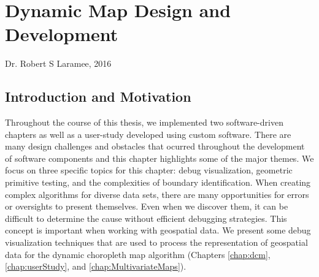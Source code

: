 \chapter{Dynamic Map Design and Development}
\label{chap:softdev}

{Dr. Robert S Laramee, 2016}

\newpage
{\footnotesize \hypersetup{linkcolor=black}
\minitoc} \newpage

\section{Introduction and Motivation}
Throughout the course of this thesis, we implemented two software-driven chapters as well as a user-study developed using custom software. There are many design challenges and obstacles that ocurred throughout the development of software components and this chapter highlights some of the major themes. We focus on three specific topics for this chapter: debug visualization, geometric primitive testing, and the complexities of boundary identification.
When creating complex algorithms for diverse data sets, there are many opportunities for errors or oversights to present themselves. Even when we discover them, it can be difficult to determine the cause without efficient debugging strategies. This concept is important when working with geospatial data.
We present some debug visualization techniques that are used to process the representation of geospatial data for the dynamic choropleth map algorithm (Chapters \ref{chap:dcm}, \ref{chap:userStudy}, and \ref{chap:MultivariateMaps}).



